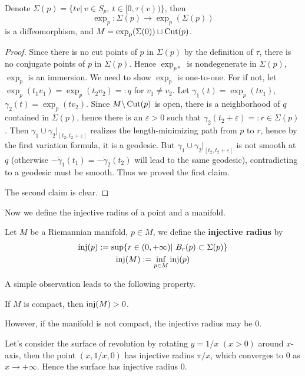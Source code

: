 \begin{prop}
    Denote $\Sigma(p)=\{tv|\ v\in S_p,\ t\in[0,\tau(v))\}$, then
    \[\exp_p:\Sigma(p)\to\exp_p(\Sigma(p))\]
    is a diffeomorphism, and $M=\exp_p(\Sigma(0))\sqcup\operatorname{Cut}(p)$.
\end{prop}
\begin{proof}
    Since there is no cut points of $p$ in $\Sigma(p)$ by the definition of $\tau$, there is no conjugate points of $p$ in $\Sigma(p)$.
    Hence $\exp_{p*}$ is nondegenerate in $\Sigma(p)$, $\exp_{p}$ is an immersion.
    We need to show $\exp_p$ is one-to-one.
    For if not, let $\exp_p(t_1v_1)=\exp_p(t_2v_2)=:q$ for $v_1\neq v_2$.
    Let $\gamma_1(t)=\exp_p(tv_1)$, $\gamma_2(t)=\exp_p(tv_2)$.
    Since $M\backslash\operatorname{Cut}(p)$ is open, there is a neighborhood of $q$ contained in $\Sigma(p)$, hence there is an $\varepsilon>0$ such that $\gamma_2(t_2+\varepsilon)=:r\in\Sigma(p)$.
    Then $\gamma_1\cup\gamma_2|_{[t_2,t_2+\varepsilon]}$ realizes the length-minimizing path from $p$ to $r$, hence by the first variation formula, it is a geodesic.
    But $\gamma_1\cup\gamma_2|_{[t_2,t_2+\varepsilon]}$ is not smooth at $q$ (otherwise $-\dot{\gamma}_1(t_1)=-\dot{\gamma}_2(t_2)$ will lead to the same geodesic), contradicting to a geodesic must be smooth.
    Thus we proved the first claim.

    The second claim is clear.
\end{proof}

Now we define the injective radius of a point and a manifold.
\begin{defn}
    Let $M$ be a Riemannian manifold, $p\in M$, we define the \textbf{injective radius} by
    \begin{gather*}
        \operatorname{inj}(p):=\sup\{r\in(0,+\infty)|\ B_r(p)\subset\Sigma(p)\}\\
        \operatorname{inj}(M):=\inf_{p\in M}\operatorname{inj}(p)
    \end{gather*}
\end{defn}

A simple observation leads to the following property.
\begin{prop}
    If $M$ is compact, then $\operatorname{inj}(M)>0$.
\end{prop}

However, if the manifold is not compact, the injective radius may be $0$.
\begin{eg}
    Let's consider the surface of revolution by rotating $y=1/x$ $(x>0)$ around $x$-axis, then the point $(x,1/x,0)$ has injective radius $\pi/x$, which converges to $0$ as $x\to+\infty$.
    Hence the surface has injective radius $0$.
\end{eg}

